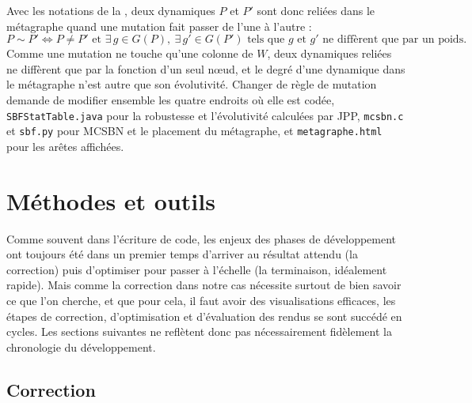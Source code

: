 \documentclass[12pt, a4paper]{article}
\begin{document}
Avec les notations de la , deux dynamiques $P$ et $P'$ sont donc reliées dans le métagraphe quand une mutation fait passer de l'une à l'autre :
\begin{equation}
P \sim P' \iff P \neq P' \text{ et } \exists\, g \in G(P),\ \exists\, g' \in G(P') \text{ tels que } g \text{ et } g' \text{ ne diffèrent que par un poids.}
\end{equation}
Comme une mutation ne touche qu'une colonne de $W$, deux dynamiques reliées ne diffèrent que par la fonction d'un seul nœud, et le degré d'une dynamique dans le métagraphe n'est autre que son évolutivité.
Changer de règle de mutation demande de modifier ensemble les quatre endroits où elle est codée, \texttt{SBFStatTable.java} pour la robustesse et l'évolutivité calculées par JPP, \texttt{mcsbn.c} et \texttt{sbf.py} pour MCSBN et le placement du métagraphe, et \texttt{metagraphe.html} pour les arêtes affichées.

\section{Méthodes et outils}

Comme souvent dans l'écriture de code, les enjeux des phases de développement ont toujours été dans un premier temps d'arriver au résultat attendu (la correction) puis d'optimiser pour passer à l'échelle (la terminaison, idéalement rapide). Mais comme la correction dans notre cas nécessite surtout de bien savoir ce que l'on cherche, et que pour cela, il faut avoir des visualisations efficaces, les étapes de correction, d'optimisation et d'évaluation des rendus se sont succédé en cycles. Les sections suivantes ne reflètent donc pas nécessairement fidèlement la chronologie du développement.


\subsection{Correction}
\label{sec:correction}
\end{document}
